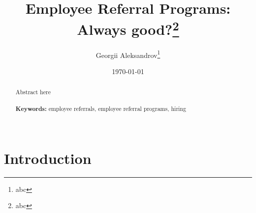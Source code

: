 \documentclass[12pt]{article}
\begin{document}
\begin{titlepage}
\title{Employee Referral Programs: Always good?\thanks{abc}}
\author{Georgii Aleksandrov\thanks{abc}}
\date{\today}
\maketitle
\begin{abstract}
\noindent Abstract here\\
\vspace{0in}\\
\noindent\textbf{Keywords:} employee referrals, employee referral programs, hiring\\
\vspace{0in}\\

\bigskip
\end{abstract}
\setcounter{page}{0}
\thispagestyle{empty}
\end{titlepage}
\pagebreak \newpage




\doublespacing


\section{Introduction} \label{sec:introduction}

\end{document}
